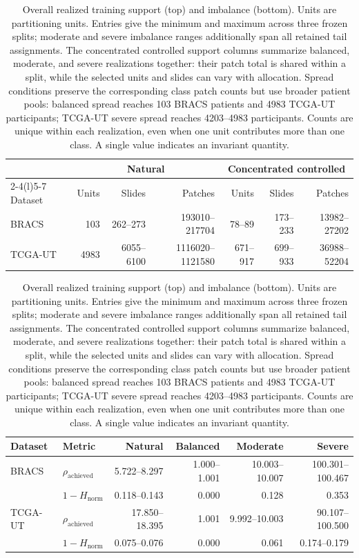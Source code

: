 \documentclass[11pt]{article}
\newcommand{\Hnorm}{1-H_{\mathrm{norm}}}
\begin{document}
\begin{table}[htbp]
  \centering
  \footnotesize
  \setlength{\tabcolsep}{3.5pt}
  \begin{tabular}{@{}lrrrrrr@{}}
    \toprule
    & \multicolumn{3}{c}{Natural} & \multicolumn{3}{c}{Concentrated controlled} \\
    \cmidrule(lr){2-4}\cmidrule(l){5-7}
    Dataset & Units & Slides & Patches & Units & Slides & Patches \\
    \midrule
    BRACS & \num{103} & \num{262}--\num{273} & \num{193010}--\num{217704} & \num{78}--\num{89} & \num{173}--\num{233} & \num{13982}--\num{27202} \\
    TCGA-UT & \num{4983} & \num{6055}--\num{6100} & \num{1116020}--\num{1121580} & \num{671}--\num{917} & \num{699}--\num{933} & \num{36988}--\num{52204} \\
    \bottomrule
  \end{tabular}
  \vspace{0.8em}

  \begin{tabular}{@{}llrrrr@{}}
    \toprule
    Dataset & Metric & Natural & Balanced & Moderate & Severe \\
    \midrule
    BRACS & $\rho_{\mathrm{achieved}}$ & \num{5.722}--\num{8.297} & \num{1.000}--\num{1.001} & \num{10.003}--\num{10.007} & \num{100.301}--\num{100.467} \\
          & $\Hnorm$ & \num{0.118}--\num{0.143} & \num{0.000} & \num{0.128} & \num{0.353} \\
    \addlinespace[2pt]
    TCGA-UT & $\rho_{\mathrm{achieved}}$ & \num{17.850}--\num{18.395} & \num{1.001} & \num{9.992}--\num{10.003} & \num{90.107}--\num{100.500} \\
          & $\Hnorm$ & \num{0.075}--\num{0.076} & \num{0.000} & \num{0.061} & \num{0.174}--\num{0.179} \\
    \bottomrule
  \end{tabular}
  \caption{Overall realized training support (top) and imbalance (bottom). Units are partitioning units. Entries give the minimum and maximum across three frozen splits; moderate and severe imbalance ranges additionally span all retained tail assignments. The concentrated controlled support columns summarize balanced, moderate, and severe realizations together: their patch total is shared within a split, while the selected units and slides can vary with allocation. Spread conditions preserve the corresponding class patch counts but use broader patient pools: balanced spread reaches \num{103} BRACS patients and \num{4983} TCGA-UT participants; TCGA-UT severe spread reaches \num{4203}--\num{4983} participants. Counts are unique within each realization, even when one unit contributes more than one class. A single value indicates an invariant quantity.}
  \label{tab:realized-condition-support}
\end{table}
\end{document}
